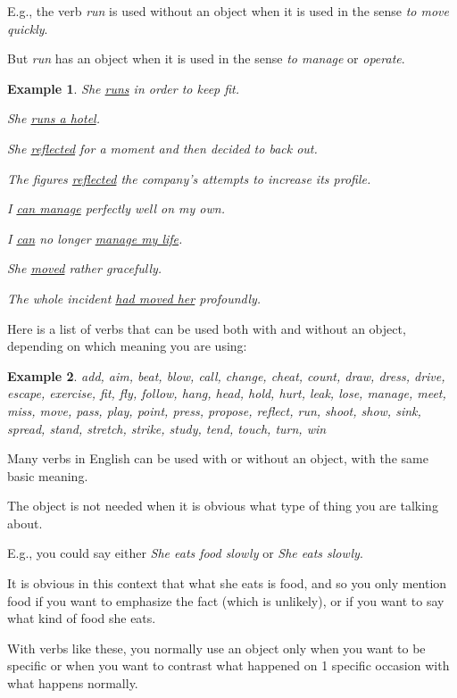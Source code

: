 \documentclass[oneside]{book}
\numberwithin{equation}{section}
\newtheorem{example}{Example}[section]
\begin{document}
E.g., the verb \textit{run} is used without an object when it is used in the sense \textit{to move quickly}.

But \textit{run} has an object when it is used in the sense \textit{to manage} or \textit{operate}.
\begin{example}
    She \underline{runs} in order to keep fit.
    
    She \underline{runs a hotel}.
    
    She \underline{reflected} for a moment and then decided to back out.
    
    The figures \underline{reflected} the company's attempts to increase its profile.
    
    I \underline{can manage} perfectly well on my own.
    
    I \underline{can} no longer \underline{manage my life}.
    
    She \underline{moved} rather gracefully.
    
    The whole incident \underline{had moved her} profoundly.
\end{example}
%
\noindent{} Here is a list of verbs that can be used both with and without an object, depending on which meaning you are using:
\begin{example}
    add, aim, beat, blow, call, change, cheat, count, draw, dress, drive, escape, exercise, fit, fly, follow, hang, head, hold, hurt, leak, lose, manage, meet, miss, move, pass, play, point, press, propose, reflect, run, shoot, show, sink, spread, stand, stretch, strike, study, tend, touch, turn, win
\end{example}
%
\noindent{} Many verbs in English can be used with or without an object, with the same basic meaning.

The object is not needed when it is obvious what type of thing you are talking about.

%
E.g., you could say either \textit{She eats food slowly} or \textit{She eats slowly}.

It is obvious in this context that what she eats is food, and so you only mention food if you want to emphasize the fact (which is unlikely), or if you want to say what kind of food she eats.

%
With verbs like these, you normally use an object only when you want to be specific or when you want to contrast what happened on 1 specific occasion with what happens normally.
\end{document}
